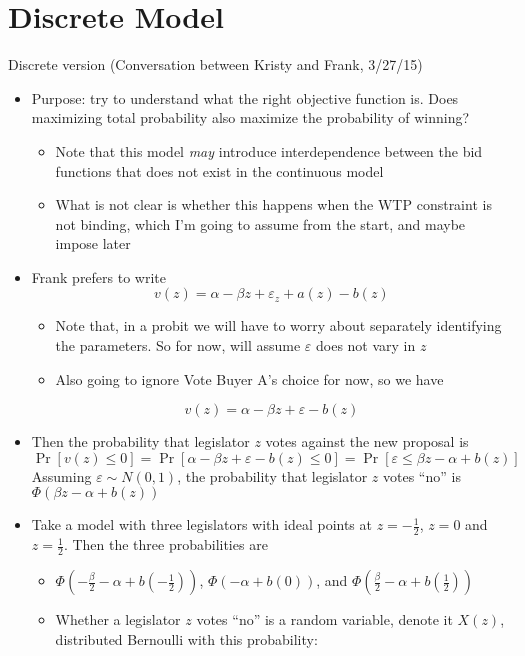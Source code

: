 \documentclass[12pt]{article}
\newcommand{\ve}{\varepsilon}
\begin{document}
\section{Discrete Model}
\newpage
Discrete version (Conversation between Kristy and Frank, 3/27/15)
\begin{itemize}
	\item Purpose: try to understand what the right objective function is. Does maximizing total probability also maximize the probability of winning?
		\begin{itemize}
			\item Note that this model \textit{may} introduce interdependence between the bid functions that does not exist in the continuous model
			\item What is not clear is whether this happens when the WTP constraint is not binding, which I'm going to assume from the start, and maybe impose later
		\end{itemize}
	\item Frank prefers to write
	  \[
		  v(z) = \alpha -\beta z + \ve_z + a(z) - b(z)
		\]
			\begin{itemize}
				\item Note that, in a probit we will have to worry about separately identifying the parameters. So for now, will assume $\ve$ does not vary in $z$
				\item Also going to ignore Vote Buyer A's choice for now, so we have
			\end{itemize}
	  \[
		  v(z) = \alpha -\beta z + \ve - b(z)
		\]
	\item Then the probability that legislator $z$ votes against the new proposal is
	  \[
		  \Pr\left[v(z)\leq 0 \right] = \Pr\left[\alpha -\beta z + \ve - b(z) \leq 0 \right] 
			                            = \Pr\left[\ve \leq \beta z - \alpha + b(z) \right] 
		\]
		Assuming $\ve \sim N(0,1)$, the probability that legislator $z$ votes ``no'' is $\Phi\left(\beta z - \alpha + b(z) \right)$
	\item Take a model with three legislators with ideal points at $z=-\frac{1}{2}$, $z=0$ and $z=\frac{1}{2}$. Then the three probabilities are
		\begin{itemize}
			\item $\Phi\left(-\frac{\beta}{2} - \alpha + b(-\frac{1}{2}) \right)$, $\Phi\left(- \alpha + b(0) \right)$, and $\Phi\left(\frac{\beta}{2} - \alpha + b(\frac{1}{2}) \right)$
			\item Whether a legislator $z$ votes ``no'' is a random variable, denote it $X(z)$, distributed Bernoulli with this probability:

\end{itemize}
\end{itemize}
\end{document}
